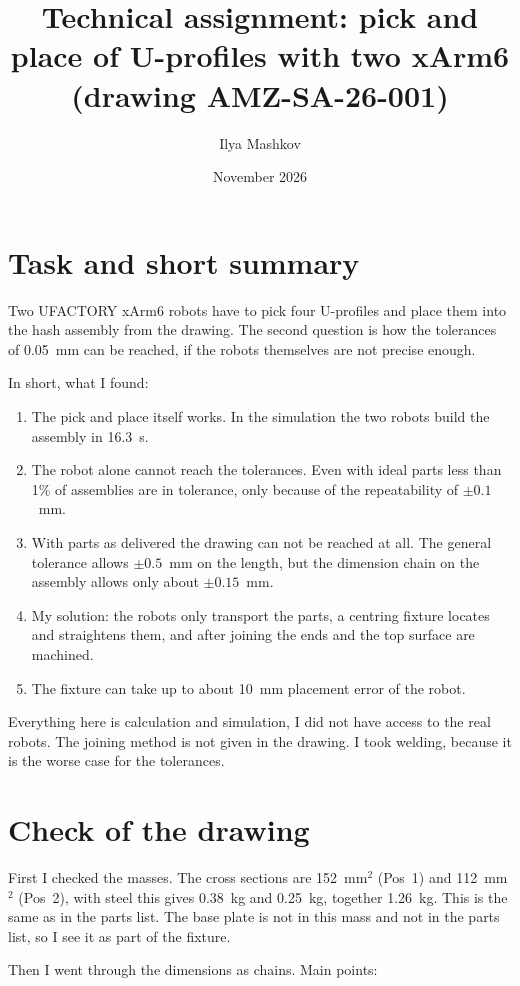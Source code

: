 \documentclass[11pt,a4paper]{article}
\title{Technical assignment: pick and place of U-profiles with two xArm6\\ \large (drawing AMZ-SA-26-001)}
\author{Ilya Mashkov}
\date{November 2026}
\begin{document}
\maketitle

\section{Task and short summary}
Two UFACTORY xArm6 robots have to pick four U-profiles and place them into the hash assembly from the drawing. The second question is how the tolerances of 0.05~mm can be reached, if the robots themselves are not precise enough.

In short, what I found:
\begin{enumerate}
\item The pick and place itself works. In the simulation the two robots build the assembly in 16.3~s.
\item The robot alone cannot reach the tolerances. Even with ideal parts less than 1\% of assemblies are in tolerance, only because of the repeatability of $\pm0.1$~mm.
\item With parts as delivered the drawing can not be reached at all. The general tolerance allows $\pm0.5$~mm on the length, but the dimension chain on the assembly allows only about $\pm0.15$~mm.
\item My solution: the robots only transport the parts, a centring fixture locates and straightens them, and after joining the ends and the top surface are machined.
\item The fixture can take up to about 10~mm placement error of the robot.
\end{enumerate}

Everything here is calculation and simulation, I did not have access to the real robots. The joining method is not given in the drawing. I took welding, because it is the worse case for the tolerances.

\section{Check of the drawing}
First I checked the masses. The cross sections are 152~mm$^2$ (Pos~1) and 112~mm$^2$ (Pos~2), with steel this gives 0.38~kg and 0.25~kg, together 1.26~kg. This is the same as in the parts list. The base plate is not in this mass and not in the parts list, so I see it as part of the fixture.

Then I went through the dimensions as chains. Main points:
\end{document}
